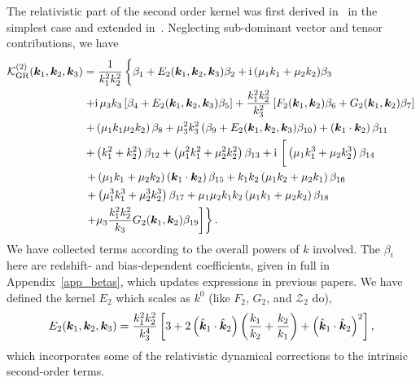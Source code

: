 The relativistic part of the second order kernel was first derived in~\cite{Umeh:2016nuh} in the simplest case and extended in~\cite{Jolicoeur:2017nyt,Jolicoeur:2017eyi,Jolicoeur:2018blf}. Neglecting sub-dominant vector and tensor contributions, we have 
\begin{align}\label{eq:soGRkernel}
\ko_\mathrm{GR}^{(2)}(\ka,\kb,\kc) &= \frac{1}{k_1^2 k_2^2} \left\{ \vphantom{\frac{k_1^2 k_2^2}{k_3}} \beta_1 + E_2(\ka,\kb,\kc) \beta_2 +\i (\mu_1k_1+\mu_2k_2)\beta_3\right. \nonumber \\
&\left. 
+ \i \mu_3 k_3\left[ \beta_{4} + E_2(\ka, \kb, \kc)\beta_{5}\right] +\frac{k_1^2 k_2^2}{k_3^2} \left[ F_2(\ka,\kb) \beta_{6} + G_2(\ka,\kb) \beta_{7} \right] \right. \nonumber \\
&\left.   + \left( \mu_1 k_1 \mu_2 k_2 \right)\beta_{8}  + \mu_3^2 k_3^2 \left(\beta_{9} + E_2(\ka,\kb,\kc) \beta_{10} \right) + \left(\ka \cdot \kb \right)\beta_{11} \right. \nonumber \\
&\left. + \left( k_1^2 + k_2^2 \right) \beta_{12} + \left( \mu_1^2 k_1^2 + \mu_2^2 k_2^2 \right) \beta_{13} + \i \left[\vphantom{\frac{k_1^2 k_2^2}{k_3}} \left( \mu_1 k_1^3 + \mu_2 k_2^3 \right)\beta_{14} \right. \right. \nonumber \\
&\left. \left. + \left( \mu_1 k_1 + \mu_2 k_2 \right) \left(\ka\cdot\kb \right) \beta_{15} + k_1 k_2 \left(\mu_1 k_2 + \mu_2 k_1 \right) \beta_{16} \right. \right. \nonumber \\
&\left. \left. + \left( \mu_1^3 k_1^3 + \mu_2^3 k_2^3 \right)\beta_{17} + \mu_1 \mu_2 k_1 k_2 \left( \mu_1 k_1 + \mu_2 k_2 \right) \beta_{18} \right. \right. \nonumber \\
&\left. \left. + \mu_3 \frac{k_1^2 k_2^2}{k_3} G_2(\ka,\kb) \beta_{19} \right] \right\}.
\end{align}
We have collected terms according to the overall powers of $k$ involved.
The \(\beta_i\) here are redshift- and bias-dependent coefficients, given in full in Appendix~\ref{app_betas}, which updates expressions in previous papers.
We have defined the kernel \(E_2\) which scales as \(k^0\) (like \(F_2\), \(G_2\), and \(\mathcal{Z}_2\) do), 
\begin{equation}
E_2(\bm {k}_1,\bm {k}_2,\bm {k}_3) = \frac{k_1^2 k_2^2}{k_3^4} \left[ 3 + 2 \left( \hat{\bm {k}}_1 \cdot\hat{\bm {k}}_2 \right) \left( \frac{k_1}{k_2} + \frac{k_2}{k_1} \right) + \left( \hat{\bm {k}}_1 \cdot \hat{\bm {k}}_2 \right)^2 \right],
\end{equation}
which incorporates some of the relativistic dynamical corrections to the intrinsic second-order terms.

